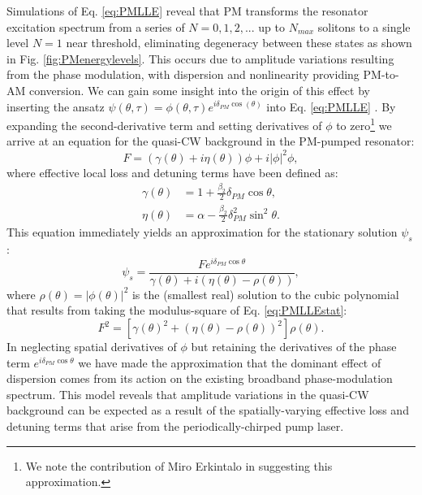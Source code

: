Simulations of Eq. \ref{eq:PMLLE} reveal that PM transforms the resonator excitation spectrum from a series of $N=0, 1, 2,...$ up to $N_{max}$ solitons to a single level $N=1$ near threshold, eliminating degeneracy between these states as shown in Fig. \ref{fig:PMenergylevels}. This occurs due to amplitude variations resulting from the phase modulation, with dispersion and nonlinearity providing PM-to-AM conversion. We can gain some insight into the origin of this effect by inserting the ansatz $\psi(\theta,\tau)=\phi(\theta,\tau)e^{i\delta_{PM}\cos(\theta)}$ into Eq. \ref{eq:PMLLE} \cite{Jang2015a}.  By expanding the second-derivative term and setting derivatives of $\phi$ to zero\footnote{We note the contribution of Miro Erkintalo in suggesting this approximation.} we arrive at an equation for the quasi-CW background in the PM-pumped resonator:
\begin{equation}
F=\left(\gamma(\theta)+i\eta(\theta)\right)\phi+i|\phi|^2\phi, \label{eq:PMLLEstat}
\end{equation}
where effective local loss and detuning terms have been defined as:
\begin{align}
\gamma(\theta)&=1+\frac{\beta_2}{2}\delta_{PM}\cos{\theta},\\
\eta(\theta)&=\alpha-\frac{\beta_2}{2}\delta_{PM}^2\sin^2{\theta}.
\end{align}
This equation immediately yields an approximation for the stationary solution $\psi_s$:
\begin{equation}
\psi_s=\frac{Fe^{i\delta_{PM}\cos{\theta}}}{\gamma(\theta)+i\left(\eta(\theta)-\rho(\theta)\right)},
\end{equation}
where $\rho(\theta)=|\phi(\theta)|^2$ is the (smallest real) solution to the cubic polynomial that results from taking the modulus-square of Eq. \ref{eq:PMLLEstat}:
\begin{equation}
F^2=\left[\gamma(\theta)^2+\left(\eta(\theta)-\rho(\theta)\right)^2\right]\rho(\theta).
\end{equation}
In neglecting spatial derivatives of $\phi$ but retaining the derivatives of the phase term $e^{i\delta_{PM}\cos{\theta}}$ we have made the approximation that the dominant effect of dispersion comes from its action on the existing broadband phase-modulation spectrum. This model reveals that amplitude variations in the quasi-CW background can be expected as a result of the spatially-varying effective loss and detuning terms that arise from the periodically-chirped pump laser.

